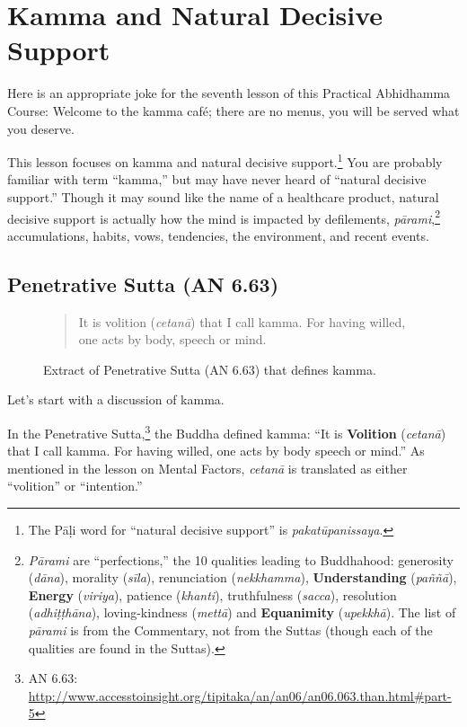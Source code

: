 \section{Kamma and Natural Decisive Support}

Here is an appropriate joke for the seventh lesson of this Practical Abhidhamma Course: Welcome to the kamma café; there are no menus, you will be served what you deserve. 

This lesson focuses on kamma and natural decisive support.\footnote{The Pāḷi word for “natural decisive support” is \textit{pakatūpanissaya}.} You are probably familiar with term “kamma,” but may have never heard of “natural decisive support.” Though it may sound like the name of a healthcare product, natural decisive support is actually how the mind is impacted by defilements, \textit{pārami},\footnote{\textit{Pārami} are “perfections,” the 10 qualities leading to Buddhahood: generosity (\textit{dāna}), morality (\textit{sīla}), renunciation (\textit{nekkhamma}), \textbf{Understanding} (\textit{paññā}), \textbf{Energy} (\textit{viriya}), patience (\textit{khanti}), truthfulness (\textit{sacca}), resolution (\textit{adhiṭṭhāna}), loving-kindness (\textit{mettā}) and \textbf{Equanimity} (\textit{upekkhā}). The list of \textit{pārami} is from the Commentary, not from the Suttas (though each of the qualities are found in the Suttas).} accumulations, habits, vows, tendencies, the environment, and recent events.

\subsection*{Penetrative Sutta (AN 6.63)}

\begin{figure}[H]
\begin{quotation}
It is volition (\textit{cetanā}) that I call kamma. For having willed, one acts by body, speech or mind.
\end{quotation}
\caption{Extract of Penetrative Sutta (AN 6.63) that defines kamma.}
\label{fig:AN6_63}
\end{figure}

Let's start with a discussion of kamma. 

In the Penetrative Sutta,\footnote{AN 6.63: \url{http://www.accesstoinsight.org/tipitaka/an/an06/an06.063.than.html\#part-5}} the Buddha defined kamma: “It is \textbf{Volition} (\textit{cetanā}) that I call kamma. For having willed, one acts by body speech or mind.” As mentioned in the lesson on Mental Factors, \textit{cetanā} is translated as either “volition” or “intention.”


